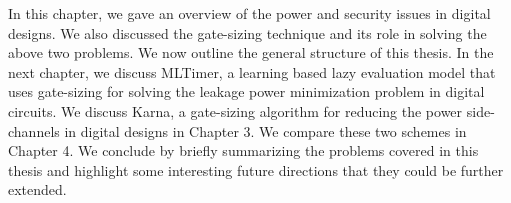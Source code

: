  In this chapter, we gave an overview of the power and security issues in digital designs. We also discussed the gate-sizing technique and its role in solving the above two problems. We now outline the general structure of this thesis. In the next chapter, we discuss MLTimer, a learning based lazy evaluation model that uses gate-sizing for solving the leakage power minimization problem in digital circuits. We discuss Karna, a gate-sizing algorithm for reducing the power side-channels in digital designs in Chapter 3. We compare these two schemes in Chapter 4. We conclude by briefly summarizing the problems covered in this thesis and highlight some interesting future directions that they could be further extended.




